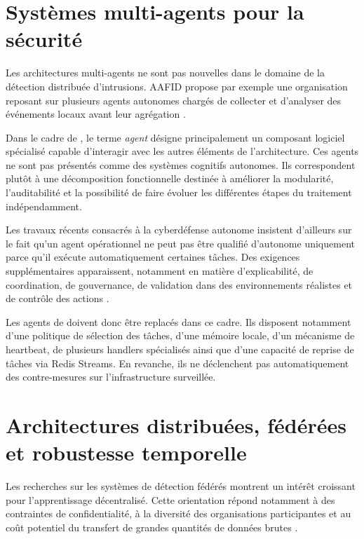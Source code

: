 \section{Systèmes multi-agents pour la sécurité}

Les architectures multi-agents ne sont pas nouvelles dans le domaine de la détection distribuée d'intrusions. AAFID propose par exemple une organisation reposant sur plusieurs agents autonomes chargés de collecter et d'analyser des événements locaux avant leur agrégation \cite{balasubramaniyan1998aafid}.

Dans le cadre de \logminer{}, le terme \textit{agent} désigne principalement un composant logiciel spécialisé capable d'interagir avec les autres éléments de l'architecture. Ces agents ne sont pas présentés comme des systèmes cognitifs autonomes. Ils correspondent plutôt à une décomposition fonctionnelle destinée à améliorer la modularité, l'auditabilité et la possibilité de faire évoluer les différentes étapes du traitement indépendamment.

Les travaux récents consacrés à la cyberdéfense autonome insistent d'ailleurs sur le fait qu'un agent opérationnel ne peut pas être qualifié d'autonome uniquement parce qu'il exécute automatiquement certaines tâches. Des exigences supplémentaires apparaissent, notamment en matière d'explicabilité, de coordination, de gouvernance, de validation dans des environnements réalistes et de contrôle des actions \cite{vyas2026acnd}.

Les agents de \logminer{} doivent donc être replacés dans ce cadre. Ils disposent notamment d'une politique de sélection des tâches, d'une mémoire locale, d'un mécanisme de heartbeat, de plusieurs handlers spécialisés ainsi que d'une capacité de reprise de tâches via Redis Streams. En revanche, ils ne déclenchent pas automatiquement des contre-mesures sur l'infrastructure surveillée.

\section{Architectures distribuées, fédérées et robustesse temporelle}

Les recherches sur les systèmes de détection fédérés montrent un intérêt croissant pour l'apprentissage décentralisé. Cette orientation répond notamment à des contraintes de confidentialité, à la diversité des organisations participantes et au coût potentiel du transfert de grandes quantités de données brutes \cite{khraisat2024federatedids,makris2025fids}.

